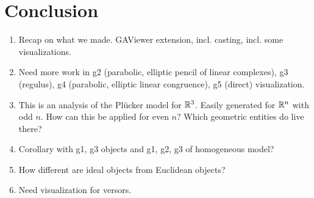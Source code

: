 \section{Conclusion}
\label{ch:conclusion}


\begin{enumerate}
  \item Recap on what we made. GAViewer extension, incl. casting, incl. some visualizations.
  \item Need more work in g2 (parabolic, elliptic pencil of linear complexes), g3 (regulus), g4 (parabolic, elliptic linear congruence), g5 (direct) visualization.  
  \item This is an analysis of the Pl\"ucker model for $\mathbb{R}^3$. Easily generated for $\mathbb{R}^n$ with odd $n$.  How can this be applied for even $n$? Which geometric entities do live there?
  \item Corollary with g1, g3 objects and g1, g2, g3 of homogeneous model?
  \item How different are ideal objects from Euclidean objects?
  \item Need visualization for versors.
\end{enumerate}

